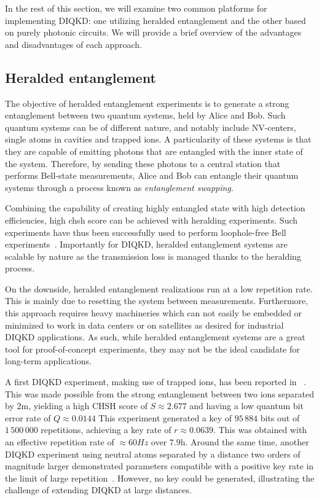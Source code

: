 \medbreak

In the rest of this section, we will examine two common platforms for implementing DIQKD: one utilizing heralded entanglement and the other based on purely photonic circuits. 
We will provide a brief overview of the advantages and disadvantages of each approach.

\subsection{Heralded entanglement}

The objective of heralded entanglement experiments is to generate a strong entanglement between two quantum systems, held by Alice and Bob.
Such quantum systems can be of different nature, and notably include NV-centers, single atoms in cavities and trapped ions.
A particularity of these systems is that they are capable of emitting photons that are entangled with the inner state of the system.
Therefore, by sending these photons to a central station that performs Bell-state measurements, Alice and Bob can entangle their quantum systems through a process known as \textit{entanglement swapping}.

Combining the capability of creating highly entangled state with high detection efficiencies, high \acrshort{chsh} score can be achieved with heralding experiments. 
Such experiments have thus been successfully used to perform loophole-free Bell experiments~\cite{Hensen2015,Rosenfeld2017}.
Importantly for DIQKD, heralded entanglement systems are scalable by nature as the transmission loss is managed thanks to the heralding process.

On the downside, heralded entanglement realizations run at a low repetition rate. 
This is mainly due to resetting the system between measurements.
Furthermore, this approach requires heavy machineries which can not easily be embedded or minimized to work in data centers or on satellites as desired for industrial DIQKD applications.
As such, while heralded entanglement systems are a great tool for proof-of-concept experiments, they may not be the ideal candidate for long-term applications.

\medbreak

A first DIQKD experiment, making use of trapped ions, has been reported in ~\cite{Nadlinger2022}.
This was made possible from the strong entanglement between two ions separated by $2\mathrm{m}$, yielding a high CHSH score of $S\approx 2.677$ and having a low quantum bit error rate of $Q\approx 0.0144$
This experiment generated a key of $95\,884$ bits out of $1\,500\,000$ repetitions, achieving a key rate of $r \approx 0.0639$. This was obtained with an effective repetition rate of $\approx 60Hz$ over $7.9$h. 
Around the same time, another DIQKD experiment using neutral atoms separated by a distance two orders of magnitude larger demonstrated parameters compatible with a positive key rate in the limit of large repetition~\cite{Zhang2022}. 
However, no key could be generated, illustrating the challenge of extending DIQKD at large distances.

